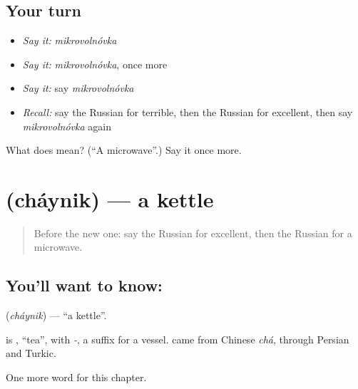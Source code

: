 \subsection*{Your turn}
\begin{itemize}
\raggedright
  \item \emph{Say it:} \emph{mikrovolnóvka}
  \item \emph{Say it:} \emph{mikrovolnóvka}, once more
  \item \emph{Say it:} say \emph{mikrovolnóvka}
  \item \emph{Recall:} say the Russian for terrible, then the Russian for excellent, then say \emph{mikrovolnóvka} again
\end{itemize}

\begin{tcolorbox}[breakable,colback=teal!4,colframe=teal!35!black,title={Before you move on}]
What does  mean? (\textquotedblleft{}A microwave\textquotedblright{}.) Say it once more.
\end{tcolorbox}
\section[\texorpdfstring{\ru{чайник} (cháynik)}{чайник (cháynik)}]{ (cháynik) — a kettle}

\label{lesson:RU-C246-chaynik}



\begin{quote}
Before the new one: say the Russian for excellent, then the Russian for a microwave.
\end{quote}

\subsection*{You'll want to know: }
\textbf{} (\emph{cháynik}) — \textquotedblleft{}a kettle\textquotedblright{}.

\begin{cousinweb}
\textbf{} is \emph{}, \textquotedblleft{}tea\textquotedblright{}, with \emph{-}, a suffix for a vessel. \emph{} came from Chinese \emph{chá}, through Persian and Turkic.
\end{cousinweb}

\begin{grammarlens}[title={What you've built}]
One more word for this chapter.
\end{grammarlens}

